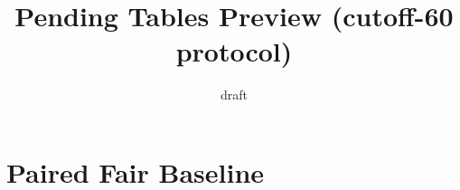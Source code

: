 \documentclass[twoside]{llncs}
\begin{document}
\title{Pending Tables Preview (cutoff-60 protocol)}
\author{draft}
\maketitle
\section{Paired Fair Baseline}

\end{document}
